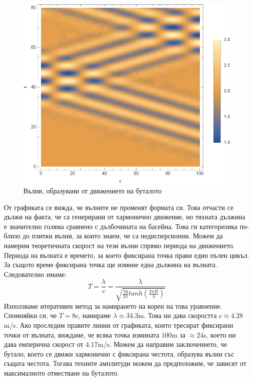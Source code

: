 \documentclass[12pt]{article}
\numberwithin{equation}{section}
\begin{document}
\begin{figure}[h]
    \centering
    \includegraphics{figures/results/piston-wave-1.eps}
    \caption{Вълни, образувани от движението на буталото}
    \label{f:piston-solution}
\end{figure}

От графиката се вижда, че вълните не променят формата си. Това отчасти се дължи на факта, че са генерирани от хармонично движение, но тяхната дължина е значително голяма сравнено с дълбочината на басейна. Това ги категоризика по-близо до плитки вълни, за които знаем, че са недисперсионни. Можем да намерим теоретичната скорост на тези вълни спрямо периода на движението. Периода на вълната е времето, за което фиксирана точка прави един пълен цикъл. За същото време фиксирана точка ще измине една дължина на вълната. Следователно имаме:
\begin{equation}
    T = \frac{\lambda}{c} = \frac{\lambda}{\sqrt{\frac{\lambda g}{2\pi}tanh(\frac{2\pi H}{\lambda})}}
\end{equation}
Използваме итеративен метод за намирането на корен на това уравнение. Спомняйки си, че $T=8$s, намираме $\lambda \approx 34.3$m. Това ни дава скоростта $c \approx 4.28$m/s. Ако проследим правите линии от графиката, които тресират фиксирани точки от вълната, виждаме, че всяка точка измината $100$m за $\approx 24$s, което ни дава емперична скорост от $4.17$m/s. Можем да направим заключението, че бутало, което се движи хармонично с фиксирана честота, образува вълни със същата честота. Тогава техните амплитуди можем да предположим, че зависят от максималното отместване на буталото.
\end{document}
